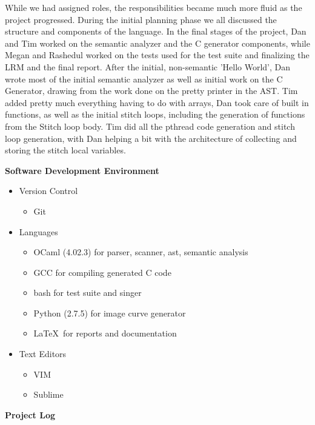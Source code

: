\documentclass[11pt, oneside]{article}   	%
\newcommand{\tab} {\hspace*{2em}}
\begin{document}
\tab While we had assigned roles, the responsibilities became much more fluid as the project progressed. During the initial planning phase we all discussed the structure and components of the language. In the final stages of the project, Dan and Tim worked on the semantic analyzer and the C generator components, while Megan and Rashedul worked on the tests used for the test suite and finalizing the LRM and the final report.  After the initial, non-semantic 'Hello World', Dan wrote most of the initial semantic analyzer as well as initial work on the C Generator, drawing from the work done on the pretty printer in the AST.  Tim added pretty much everything having to do with arrays, Dan took care of built in functions, as well as the initial stitch loops, including the generation of functions from the Stitch loop body.  Tim did all the pthread code generation and stitch loop generation, with Dan helping a bit with the architecture of collecting and storing the stitch local variables.

\newpage
\Large\textbf{Software Development Environment}\\[1em]
\normalsize
\begin{itemize}
  \item Version Control
  \begin{itemize}
    \item Git
  \end{itemize}
  \item Languages
  \begin{itemize}
    \item OCaml (4.02.3) for parser, scanner, ast, semantic analysis
    \item GCC for compiling generated C code
    \item bash for test suite and singer
    \item Python (2.7.5) for image curve generator
    \item \LaTeX\ for reports and documentation
  \end{itemize}
  \item Text Editors 
    \begin{itemize}
    \item VIM
    \item Sublime
    \end{itemize}
\end{itemize}

\newpage
\Large\textbf{Project Log}\\[1em]
\normalsize

\end{document}
